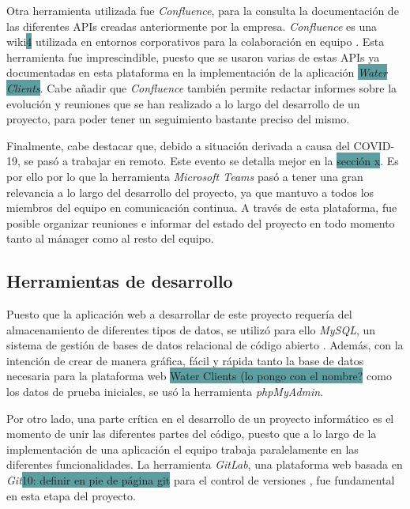 \documentclass[pdftex,11pt,a4paper]{book}
\begin{document}
Otra herramienta utilizada fue \textit{Confluence}, para la consulta la documentación de las diferentes APIs creadas anteriormente por la empresa. \textit{Confluence} es una wiki\colorbox{CadetBlue}{4} utilizada en entornos corporativos para la colaboración en equipo \cite{bib:wiki}. Esta herramienta fue imprescindible, puesto que se usaron varias de estas APIs ya documentadas en esta plataforma en la implementación de la aplicación \colorbox{CadetBlue}{\textit{Water Clients}}. Cabe añadir que \textit{Confluence} también permite redactar informes sobre la evolución y reuniones que se han realizado a lo largo del desarrollo de un proyecto, para poder tener un seguimiento bastante preciso del mismo.

Finalmente, cabe destacar que, debido a situación derivada a causa del COVID-19, se pasó a trabajar en remoto. Este evento se detalla mejor en la \colorbox{CadetBlue}{sección x}. Es por ello por lo que la herramienta \textit{Microsoft Teams} pasó a tener una gran relevancia a lo largo del desarrollo del proyecto, ya que mantuvo a todos los miembros del equipo en comunicación continua. A través de esta plataforma, fue posible organizar reuniones e informar del estado del proyecto en todo momento tanto al mánager como al resto del equipo.

\subsection{Herramientas de desarrollo}

Puesto que la aplicación web a desarrollar de este proyecto requería del almacenamiento de diferentes tipos de datos, se utilizó para ello \textit{MySQL}, un sistema de gestión de bases de datos relacional de código abierto \cite{bib:mysql}. Además, con la intención de crear de manera gráfica, fácil y rápida tanto la base de datos necesaria para la plataforma web \colorbox{CadetBlue}{Water Clients (lo pongo con el nombre?}  como los datos de prueba iniciales, se usó la herramienta \textit{phpMyAdmin}.

Por otro lado, una parte crítica en el desarrollo de un proyecto informático es el momento de unir las diferentes partes del código, puesto que a lo largo de la implementación de una aplicación el equipo trabaja paralelamente en las diferentes funcionalidades. La herramienta \textit{GitLab}, una plataforma web basada en \textit{Git}\colorbox{CadetBlue}{10: definir en pie de página git} para el control de versiones \cite{bib:gitlab}, fue fundamental en esta etapa del proyecto.
\end{document}
